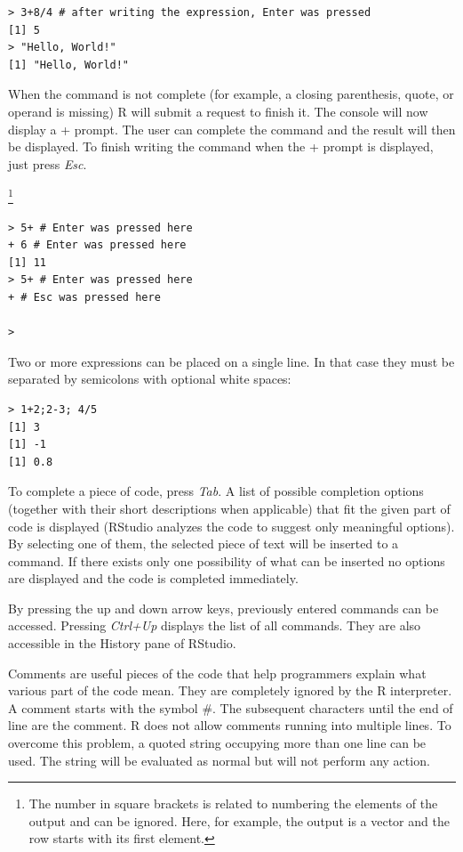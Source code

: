 \begin{verbatim}
> 3+8/4 # after writing the expression, Enter was pressed
[1] 5
> "Hello, World!"
[1] "Hello, World!"
\end{verbatim}

When the command is not complete (for example, a closing parenthesis,
quote, or operand is missing) R will submit a request to finish it. The console
will now display a + prompt. The user can complete the command and the result will then be displayed. To finish writing the command when the + prompt is
displayed, just press \textit{Esc}.

\footnote{%
The number in square brackets is related to numbering the elements of the output and can be ignored. 
Here, for example, the output is a vector and the row starts with its first element.%
}

\begin{verbatim}
> 5+ # Enter was pressed here
+ 6 # Enter was pressed here
[1] 11
> 5+ # Enter was pressed here
+ # Esc was pressed here

>
\end{verbatim}

Two or more expressions can be placed on a single line. In that case they must
be separated by semicolons with optional white spaces:

\begin{verbatim}
> 1+2;2-3; 4/5
[1] 3
[1] -1
[1] 0.8

\end{verbatim}

To complete a piece of code, press \textit{Tab}. A list of possible completion options
(together with their short descriptions when applicable) that fit the given part of
code is displayed (RStudio analyzes the code to suggest only meaningful options). By selecting one of them, the selected piece of text will be inserted to a
command. If there exists only one possibility of what can be inserted no options
are displayed and the code is completed immediately.

By pressing the up and down arrow keys, previously entered commands can
be accessed. Pressing \textit{Ctrl+Up} displays the list of all commands. They are also
accessible in the History pane of RStudio.

Comments are useful pieces of the code that help programmers explain what
various part of the code mean. They are completely ignored by the R interpreter.
A comment starts with the symbol \#. The subsequent characters until the end of
line are the comment. R does not allow comments running into multiple lines.
To overcome this problem, a quoted string occupying more than one line can be
used. The string will be evaluated as normal but will not perform any action.

